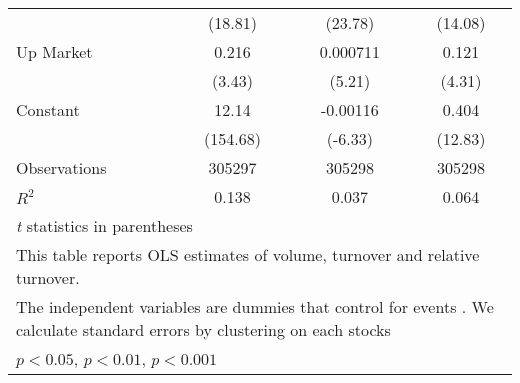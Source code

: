 {\begin{tabular}{l*{3}{c}}
                    &     (18.81)         &     (23.78)         &     (14.08)         \\
[1em]
Up Market           &       0.216\sym{***}&    0.000711\sym{***}&       0.121\sym{***}\\
                    &      (3.43)         &      (5.21)         &      (4.31)         \\
[1em]
Constant            &       12.14\sym{***}&    -0.00116\sym{***}&       0.404\sym{***}\\
                    &    (154.68)         &     (-6.33)         &     (12.83)         \\
\hline
Observations        &      305297         &      305298         &      305298         \\
\(R^{2}\)           &       0.138         &       0.037         &       0.064         \\
\hline\hline
\multicolumn{4}{l}{\footnotesize \textit{t} statistics in parentheses}\\
\multicolumn{4}{l}{\footnotesize This table reports OLS estimates of volume, turnover and relative turnover.}\\
\multicolumn{4}{l}{\footnotesize The independent variables are dummies that control for events . We calculate standard errors by clustering on each stocks}\\
\multicolumn{4}{l}{\footnotesize \sym{*} \(p<0.05\), \sym{**} \(p<0.01\), \sym{***} \(p<0.001\)}\\
\end{tabular}
}
